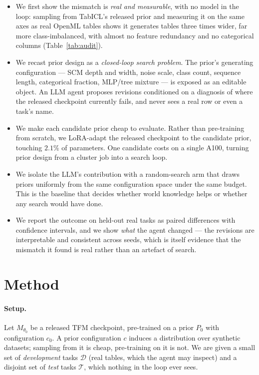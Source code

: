\documentclass{article}
\begin{document}
\begin{itemize}\itemsep1pt
\item We first show the mismatch is \emph{real and measurable}, with no model in the loop:
sampling from TabICL's released prior and measuring it on the same axes as real OpenML tables
shows it generates tables three times wider, far more class-imbalanced, with almost no feature
redundancy and no categorical columns (Table~\ref{tab:audit}).
\item We recast prior design as a \emph{closed-loop search problem}. The prior's generating
configuration --- SCM depth and width, noise scale, class count, sequence length,
categorical fraction, MLP/tree mixture --- is exposed as an editable object. An LLM agent
proposes revisions conditioned on a diagnosis of where the released checkpoint currently
fails, and never sees a real row or even a task's name.
\item We make each candidate prior cheap to evaluate. Rather than pre-training from
scratch, we LoRA-adapt the released checkpoint to the candidate prior, touching $2.1\%$ of
parameters. One candidate costs \LoRAMinutes{} on a single A100, turning prior design from a
cluster job into a search loop.
\item We isolate the LLM's contribution with a random-search arm that draws priors uniformly
from the same configuration space under the same budget. This is the baseline that decides
whether world knowledge helps or whether any search would have done.
\item We report the outcome on \NTest{} held-out real tasks as paired differences with
confidence intervals, and we show \emph{what} the agent changed --- the revisions are
interpretable and consistent across seeds, which is itself evidence that the mismatch it
found is real rather than an artefact of search.
\end{itemize}

\section{Method}

\paragraph{Setup.} Let $M_{\theta_0}$ be a released TFM checkpoint, pre-trained on a prior
$P_0$ with configuration $c_0$. A prior configuration $c$ induces a distribution over
synthetic datasets; sampling from it is cheap, pre-training on it is not. We are given a
small set of \emph{development} tasks $\mathcal{D}$ (real tables, which the agent may
inspect) and a disjoint set of \emph{test} tasks $\mathcal{T}$, which nothing in the loop
ever sees.
\end{document}
